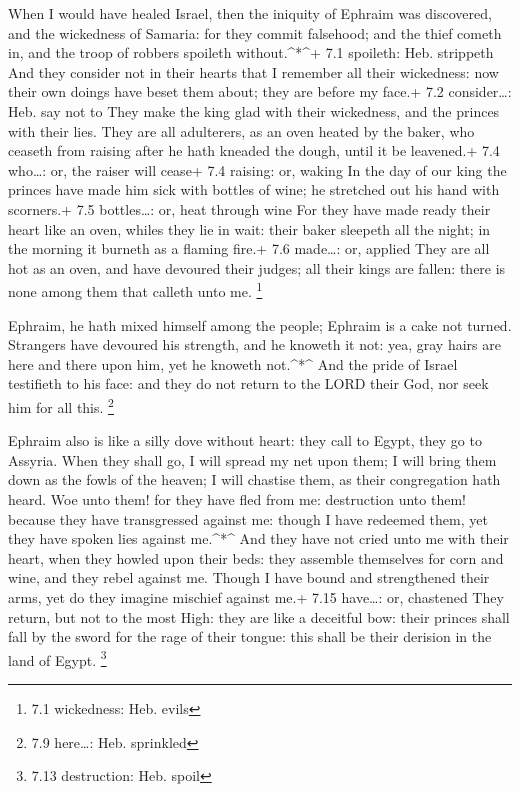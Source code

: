  When I would have healed Israel, then the iniquity of
Ephraim was discovered, and the wickedness of Samaria: for they commit
falsehood; and the thief cometh in, and the troop of robbers spoileth
without.\^{}*\^{}+ 7.1 spoileth: Heb. strippeth  And they
consider not in their hearts that I remember all their wickedness: now
their own doings have beset them about; they are before my face.+ 7.2
consider\ldots: Heb. say not to  They make the king glad
with their wickedness, and the princes with their lies. 
They are all adulterers, as an oven heated by the baker, who ceaseth
from raising after he hath kneaded the dough, until it be leavened.+ 7.4
who\ldots: or, the raiser will cease+ 7.4 raising: or, waking
 In the day of our king the princes have made him sick with
bottles of wine; he stretched out his hand with scorners.+ 7.5
bottles\ldots: or, heat through wine  For they have made
ready their heart like an oven, whiles they lie in wait: their baker
sleepeth all the night; in the morning it burneth as a flaming fire.+
7.6 made\ldots: or, applied  They are all hot as an oven,
and have devoured their judges; all their kings are fallen: there is
none among them that calleth unto me. \footnote{7.1 wickedness: Heb.
  evils}

 Ephraim, he hath mixed himself among the people; Ephraim is
a cake not turned.  Strangers have devoured his strength,
and he knoweth it not: yea, gray hairs are here and there upon him, yet
he knoweth not.\^{}*\^{}  And the pride of Israel
testifieth to his face: and they do not return to the LORD their God,
nor seek him for all this. \footnote{7.9 here\ldots: Heb. sprinkled}

 Ephraim also is like a silly dove without heart: they call
to Egypt, they go to Assyria.  When they shall go, I will
spread my net upon them; I will bring them down as the fowls of the
heaven; I will chastise them, as their congregation hath heard.
 Woe unto them! for they have fled from me: destruction
unto them! because they have transgressed against me: though I have
redeemed them, yet they have spoken lies against me.\^{}*\^{}
 And they have not cried unto me with their heart, when
they howled upon their beds: they assemble themselves for corn and wine,
and they rebel against me.  Though I have bound and
strengthened their arms, yet do they imagine mischief against me.+ 7.15
have\ldots: or, chastened  They return, but not to the most
High: they are like a deceitful bow: their princes shall fall by the
sword for the rage of their tongue: this shall be their derision in the
land of Egypt. \footnote{7.13 destruction: Heb. spoil}

